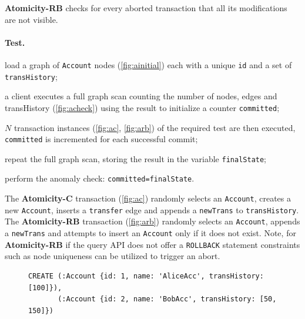   {\flushleft \textbf{Atomicity-RB}} checks for every aborted transaction that all
its modifications are not visible.

\paragraph{Test.}
\begin{enumerate*}[label={(\roman*)}]
  \item load a graph of \texttt{Account} nodes (\autoref{fig:ainitial}) each
  with a unique \texttt{id} and a set of \texttt{transHistory};
  \item a client executes a full graph scan counting the number of nodes, edges
  and transHistory (\autoref{fig:acheck}) using the result to initialize a
  counter \texttt{committed};
  \item $N$ transaction instances (\autoref{fig:ac}, \autoref{fig:arb}) of the
  required test are then executed, \texttt{committed} is incremented for
  each successful commit;
  \item repeat the full graph scan, storing the result in the variable
  \texttt{finalState};
  \item perform the anomaly check: \texttt{committed=finalState}.
\end{enumerate*}

The \textbf{Atomicity-C} transaction (\autoref{fig:ac}) randomly selects an
\texttt{Account}, creates a new \texttt{Account}, inserts a \texttt{transfer}
edge and appends a \texttt{newTrans} to \texttt{transHistory}. The \textbf{Atomicity-RB}
transaction (\autoref{fig:arb}) randomly selects an \texttt{Account}, appends a
\texttt{newTrans} and attempts to insert an \texttt{Account} only if it does
not exist. Note, for \textbf{Atomicity-RB} if the query API does not offer a
\texttt{ROLLBACK} statement constraints such as node uniqueness can be utilized
to trigger an abort.

\begin{figure}[htb]
  \centering

  \begin{lstlisting}[language=cypher,label=fig:ainitial,caption=Cypher query for creating initial data for the \tx{Atomicity} transactions.]
CREATE (:Account {id: 1, name: 'AliceAcc', transHistory: [100]}),
       (:Account {id: 2, name: 'BobAcc', transHistory: [50, 150]})
\end{lstlisting}

\end{figure}

